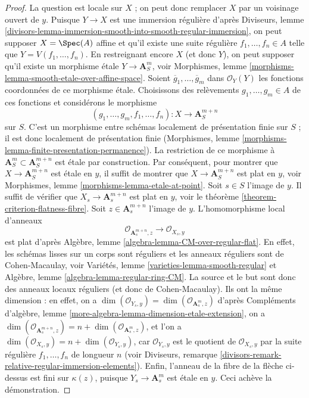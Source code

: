 \begin{proof}
La question est locale sur $X$ ; on peut donc remplacer $X$ par
un voisinage ouvert de $y$. Puisque $Y \to X$ est une immersion régulière
d'après Diviseurs, lemme
\ref{divisors-lemma-immersion-smooth-into-smooth-regular-immersion},
on peut supposer $X = \Spec(A)$ affine et qu'il existe une suite régulière
$f_1, \ldots, f_n \in A$ telle que $Y = V(f_1, \ldots, f_n)$.
En restreignant encore $X$ (et donc $Y$),
on peut supposer qu'il existe un morphisme étale $Y \to \mathbf{A}^m_S$, voir
Morphismes, lemme \ref{morphisms-lemma-smooth-etale-over-affine-space}.
Soient $\overline{g}_1, \ldots, \overline{g}_m$ dans $\mathcal{O}_Y(Y)$
les fonctions coordonnées de ce morphisme étale.
Choisissons des relèvements $g_1, \ldots, g_m \in A$ de ces fonctions
et considérons le morphisme
$$
(g_1, \ldots, g_m, f_1, \ldots, f_n) :
X
\longrightarrow
\mathbf{A}^{m + n}_S
$$
sur $S$. C'est un morphisme entre schémas localement de présentation finie
sur $S$ ; il est donc localement de présentation finie
(Morphismes, lemme \ref{morphisms-lemma-finite-presentation-permanence}).
La restriction de ce morphisme à
$\mathbf{A}^m_S \subset \mathbf{A}^{m + n}_S$
est étale par construction. Par conséquent, pour montrer que
$X \to \mathbf{A}^{m + n}_S$ est étale en $y$,
il suffit de montrer que $X \to \mathbf{A}^{m + n}_S$ est plat en $y$,
voir Morphismes, lemme \ref{morphisms-lemma-etale-at-point}.
Soit $s \in S$ l'image de $y$. Il suffit de vérifier que
$X_s \to \mathbf{A}^{m + n}_s$ est plat en $y$, voir le
théorème \ref{theorem-criterion-flatness-fibre}.
Soit $z \in \mathbf{A}^{m + n}_s$ l'image de $y$.
L'homomorphisme local d'anneaux
$$
\mathcal{O}_{\mathbf{A}^{m + n}_s, z}
\longrightarrow
\mathcal{O}_{X_s, y}
$$
est plat d'après Algèbre, lemme \ref{algebra-lemma-CM-over-regular-flat}.
En effet, les schémas lisses sur un corps sont réguliers et les anneaux réguliers
sont de Cohen-Macaulay, voir Variétés, lemme \ref{varieties-lemma-smooth-regular}
et Algèbre, lemme \ref{algebra-lemma-regular-ring-CM}.
La source et le but sont donc des anneaux locaux réguliers (et donc de Cohen-Macaulay).
Ils ont la même dimension : en effet, on a
$\dim(\mathcal{O}_{Y_s, y}) = \dim(\mathcal{O}_{\mathbf{A}^m_s, z})$
d'après Compléments d'algèbre, lemme \ref{more-algebra-lemma-dimension-etale-extension},
on a $\dim(\mathcal{O}_{\mathbf{A}^{m + n}_s, z}) = n +
\dim(\mathcal{O}_{\mathbf{A}^m_s, z})$, et l'on a
$\dim(\mathcal{O}_{X_s, y}) = n + \dim(\mathcal{O}_{Y_s, y})$,
car $\mathcal{O}_{Y_s, y}$ est le quotient de
$\mathcal{O}_{X_s, y}$ par la suite régulière $f_1, \ldots, f_n$
de longueur $n$ (voir
Diviseurs, remarque \ref{divisors-remark-relative-regular-immersion-elements}).
Enfin, l'anneau de la fibre de la flèche ci-dessus est fini sur $\kappa(z)$,
puisque $Y_s \to \mathbf{A}^m_s$ est étale en $y$.
Ceci achève la démonstration.
\end{proof}

